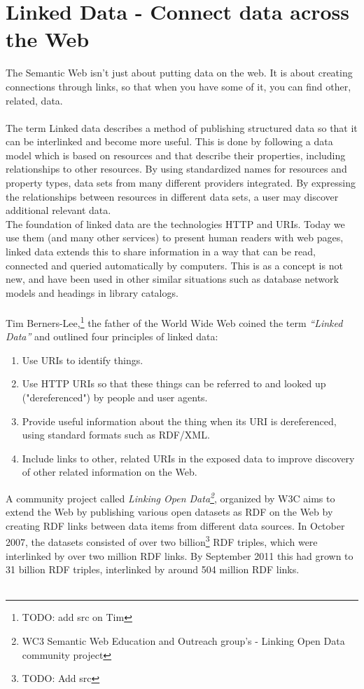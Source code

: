 \section{Linked Data - Connect data across the Web}
The Semantic Web isn't just about putting data on the web. It is about creating connections through links, so that when you have some of it, you can find other, related, data.\\\\
The term Linked data describes a method of publishing structured data so that it can be interlinked and become more useful. This is done by following a data model which is based on resources and that describe their properties, including relationships to other resources. By using standardized names for resources and property types, data sets from many different providers integrated. By expressing the relationships between resources in different data sets, a user may discover additional relevant data.\\
The foundation of linked data are the technologies HTTP and URIs. Today we use them (and many other services) to present human readers with web pages, linked data extends this to share information in a way that can be read, connected and queried automatically by computers. This is as a concept is not new, and have been used in other similar situations such as database network models and headings in library catalogs.\\\\
Tim Berners-Lee,\footnote{TODO: add src on Tim} the father of the World Wide Web coined the term \textit{“Linked Data”} and outlined four principles of linked data:
\begin{enumerate}
\item{Use URIs to identify things.}
\item{Use HTTP URIs so that these things can be referred to and looked up ("dereferenced") by people and user agents.}
\item{Provide useful information about the thing when its URI is dereferenced, using standard formats such as RDF/XML.}
\item{Include links to other, related URIs in the exposed data to improve discovery of other related information on the Web.}
\end{enumerate}
A community project called \textit{Linking Open Data\footnote{WC3 Semantic Web Education and Outreach group's - Linking Open Data community project}}, organized by W3C aims to extend the Web by publishing various open datasets as RDF on the Web by creating RDF links between data items from different data sources. In October 2007, the datasets consisted of over two billion\footnote{TODO: Add src} RDF triples, which were interlinked by over two million RDF links. By September 2011 this had grown to 31 billion RDF triples, interlinked by around 504 million RDF links.\\\\
